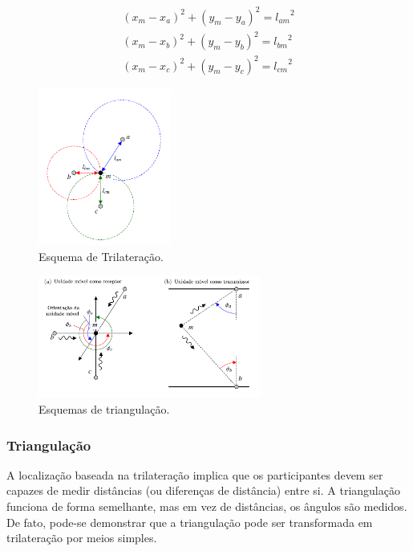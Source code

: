 \begin{align*}
(x_{m}-x_{a})^{2} + (y_{m}-y_{a})^{2} = {l_{am}}^{2}\\
(x_{m}-x_{b})^{2} + (y_{m}-y_{b})^{2} = {l_{bm}}^{2}\\
(x_{m}-x_{c})^{2} + (y_{m}-y_{c})^{2} = {l_{cm}}^{2}
\end{align*}



 \begin{figure}[ht]
\centering
    \includegraphics[resolution=300,width=0.39\textwidth,natwidth=610,natheight=642]{images/trilateracao.png}
    \caption{Esquema de Trilateração.}
    \label{fig:trilateracao}
\end{figure}


\begin{figure}[ht]
\centering
\includegraphics[resolution=300,width=0.65\textwidth,natwidth=610,natheight=642]{images/triangulacao.png}
    \caption{Esquemas de triangulação.}
    \label{fig:triang}
\end{figure}

\subsubsection{Triangulação}\label{sec:triang}


A localização baseada na trilateração implica que os participantes devem ser capazes de medir distâncias (ou diferenças de distância) entre si. A triangulação funciona de forma semelhante, mas em vez de distâncias, os ângulos são medidos. De fato, pode-se demonstrar que a triangulação pode ser transformada em trilateração por meios simples\cite{linde2006aspects}. 

